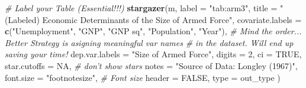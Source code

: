 \documentclass[11pt,]{article}
\newenvironment{Shaded}{\begin{snugshade}}{\end{snugshade}}
\newcommand{\KeywordTok}[1]{\textcolor[rgb]{0.13,0.29,0.53}{\textbf{#1}}}
\newcommand{\DataTypeTok}[1]{\textcolor[rgb]{0.13,0.29,0.53}{#1}}
\newcommand{\DecValTok}[1]{\textcolor[rgb]{0.00,0.00,0.81}{#1}}
\newcommand{\StringTok}[1]{\textcolor[rgb]{0.31,0.60,0.02}{#1}}
\newcommand{\CommentTok}[1]{\textcolor[rgb]{0.56,0.35,0.01}{\textit{#1}}}
\newcommand{\OtherTok}[1]{\textcolor[rgb]{0.56,0.35,0.01}{#1}}
\newcommand{\NormalTok}[1]{#1}
\begin{document}
\begin{Shaded}
\begin{Highlighting}[]
  \CommentTok{# Label your Table (Essential!!!)}
    \KeywordTok{stargazer}\NormalTok{(m, }\DataTypeTok{label =} \StringTok{"tab:arm3"}\NormalTok{,}
              \DataTypeTok{title =} \StringTok{"(Labeled) Economic Determinants of the Size of Armed Force"}\NormalTok{,}
              \DataTypeTok{covariate.labels =} \KeywordTok{c}\NormalTok{(}\StringTok{"Unemployment"}\NormalTok{, }\StringTok{"GNP"}\NormalTok{,}
                                   \StringTok{"GNP sq"}\NormalTok{, }\StringTok{"Population"}\NormalTok{, }\StringTok{"Year"}\NormalTok{),}
                \CommentTok{# Mind the order... Better Strategy is asigning meaningful var names}
                \CommentTok{# in the dataset. Will end up saving your time!}
              \DataTypeTok{dep.var.labels =} \StringTok{"Size of Armed Force"}\NormalTok{,}
              \DataTypeTok{digits =} \DecValTok{2}\NormalTok{,}
              \DataTypeTok{ci =} \OtherTok{TRUE}\NormalTok{,}
              \DataTypeTok{star.cutoffs =} \OtherTok{NA}\NormalTok{, }\CommentTok{# don't show stars}
              \DataTypeTok{notes =} \StringTok{"Source of Data: Longley (1967)"}\NormalTok{,}
              \DataTypeTok{font.size =} \StringTok{"footnotesize"}\NormalTok{, }\CommentTok{# Font size}
              \DataTypeTok{header =} \OtherTok{FALSE}\NormalTok{, }\DataTypeTok{type =}\NormalTok{ out_type}
\NormalTok{              )}
\end{Highlighting}
\end{Shaded}
\end{document}
